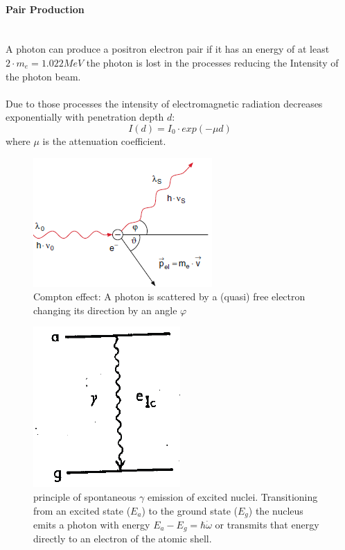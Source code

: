 \paragraph{Pair Production} \ \\
A photon can produce a positron electron pair if it has an energy of at least $2\cdot m_e=1.022MeV$ the photon is lost in the processes reducing the Intensity of the photon beam.\\ \ \\
Due to those processes the intensity of electromagnetic radiation decreases exponentially with penetration depth $d$:
\begin{equation}
I(d)=I_0 \cdot exp(-\mu d)
\end{equation}
where $\mu$ is the attenuation coefficient.
\begin{figure}[h]
	\centering
	\includegraphics[width=0.5\linewidth]{graphics/Compton}
	\caption[Compton scattering]{Compton effect: A photon is scattered by a (quasi) free electron changing its direction by an angle $\varphi$\cite{Demtröder} }
	\label{fig:principles:Compton}
\end{figure}

\begin{figure}[H]
	\centering
	\includegraphics[height=0.18\textheight]{graphics/Emission}
	\caption[spontaneous $\gamma$ emission]{principle of spontaneous $\gamma$ emission of excited nuclei. Transitioning from an excited state ($E_a$) to the ground state ($E_g$) the nucleus emits a photon with energy $E_a-E_g=\hbar\dot \omega$ or transmits that energy directly to an electron of the atomic shell.\cite{Wegener}}
	\label{fig:principles:Emission}
\end{figure}
